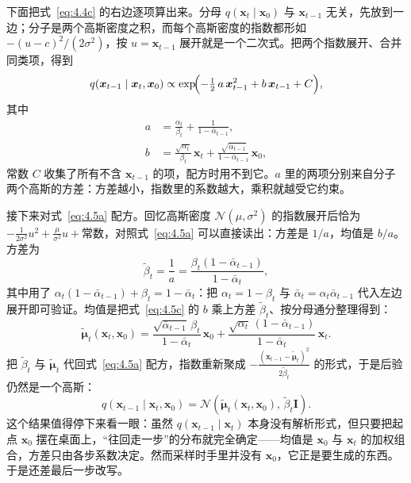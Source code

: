 \documentclass[UTF8,a4paper,12pt]{ctexart}
\numberwithin{equation}{section}
\begin{document}
下面把式~\eqref{eq:4.4c} 的右边逐项算出来。分母 $q(\bm{x}_t\mid\bm{x}_0)$ 与 $\bm{x}_{t-1}$ 无关，先放到一边；分子是两个高斯密度之积，而每个高斯密度的指数都形如 $-(u-c)^2/(2\sigma^2)$，按 $u=\bm{x}_{t-1}$ 展开就是一个二次式。把两个指数展开、合并同类项，得到
\begin{equation}\label{eq:4.5a}
q(\bm{x}_{t-1}\mid\bm{x}_t,\bm{x}_0)
\propto\exp\!\Bigl(-\tfrac{1}{2}\,a\,\bm{x}_{t-1}^2+b\,\bm{x}_{t-1}+C\Bigr),
\end{equation}
其中
\begin{align}
a&=\frac{\alpha_t}{\beta_t}+\frac{1}{1-\bar{\alpha}_{t-1}},
\label{eq:4.5b}\\[-2pt]
b&=\frac{\sqrt{\alpha_t}}{\beta_t}\,\bm{x}_t
+\frac{\sqrt{\bar{\alpha}_{t-1}}}{1-\bar{\alpha}_{t-1}}\,\bm{x}_0,
\label{eq:4.5c}
\end{align}
常数 $C$ 收集了所有不含 $\bm{x}_{t-1}$ 的项，配方时用不到它。$a$ 里的两项分别来自分子两个高斯的方差：方差越小，指数里的系数越大，乘积就越受它约束。

接下来对式~\eqref{eq:4.5a} 配方。回忆高斯密度 $\mathcal{N}(\mu,\sigma^2)$ 的指数展开后恰为 $-\frac{1}{2\sigma^2}u^2+\frac{\mu}{\sigma^2}u+\text{常数}$，对照式~\eqref{eq:4.5a} 可以直接读出：方差是 $1/a$，均值是 $b/a$。方差为
\begin{equation}\label{eq:4.5}
\tilde{\beta}_t=\frac{1}{a}
=\frac{\beta_t(1-\bar{\alpha}_{t-1})}{1-\bar{\alpha}_t},
\end{equation}
其中用了 $\alpha_t(1-\bar{\alpha}_{t-1})+\beta_t=1-\bar{\alpha}_t$：把 $\alpha_t=1-\beta_t$ 与 $\bar{\alpha}_t=\alpha_t\bar{\alpha}_{t-1}$ 代入左边展开即可验证。均值是把式~\eqref{eq:4.5c} 的 $b$ 乘上方差 $\tilde{\beta}_t$、按分母通分整理得到：
\begin{equation}\label{eq:4.6}
\tilde{\bm{\mu}}_t(\bm{x}_t,\bm{x}_0)
=\frac{\sqrt{\bar{\alpha}_{t-1}}\,\beta_t}{1-\bar{\alpha}_t}\,\bm{x}_0
+\frac{\sqrt{\alpha_t}\,(1-\bar{\alpha}_{t-1})}{1-\bar{\alpha}_t}\,\bm{x}_t .
\end{equation}
把 $\tilde{\beta}_t$ 与 $\tilde{\bm{\mu}}_t$ 代回式~\eqref{eq:4.5a} 配方，指数重新聚成 $-\frac{(\bm{x}_{t-1}-\tilde{\bm{\mu}}_t)^2}{2\tilde{\beta}_t}$ 的形式，于是后验仍然是一个高斯：
\begin{equation}\label{eq:4.6b}
q(\bm{x}_{t-1}\mid\bm{x}_t,\bm{x}_0)
=\mathcal{N}\!\left(\tilde{\bm{\mu}}_t(\bm{x}_t,\bm{x}_0),\,\tilde{\beta}_t\bm{I}\right).
\end{equation}
这个结果值得停下来看一眼：虽然 $q(\bm{x}_{t-1}\mid\bm{x}_t)$ 本身没有解析形式，但只要把起点 $\bm{x}_0$ 摆在桌面上，“往回走一步”的分布就完全确定——均值是 $\bm{x}_0$ 与 $\bm{x}_t$ 的加权组合，方差只由各步系数决定。然而采样时手里并没有 $\bm{x}_0$，它正是要生成的东西。于是还差最后一步改写。
\end{document}
